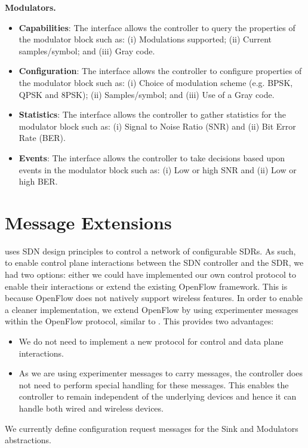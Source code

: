 \textbf{Modulators.}
\begin{itemize}
\item \textbf{Capabilities}: The interface allows the controller to query the properties of the modulator block such as:
    (i) Modulations supported;
    (ii) Current samples/symbol; and
    (iii) Gray code.
\item \textbf{Configuration}: The interface allows the controller to configure properties of the modulator block such as:
    (i) Choice of modulation scheme (e.g. BPSK, QPSK and 8PSK);
    (ii) Samples/symbol; and
    (iii) Use of a Gray code.
\item \textbf{Statistics}: The interface allows the controller to gather statistics for the modulator block such as:
    (i) Signal to Noise Ratio (SNR) and 
    (ii) Bit Error Rate (BER).
\item \textbf{Events}: The interface allows the controller to take decisions based upon events in the modulator block such as:
    (i) Low or high SNR and
    (ii) Low or high BER.
\end{itemize}

\section{\crossflow Message Extensions}
\label{sec:messages}
  		  
\crossflow uses SDN design principles to control a network of configurable SDRs. As such, to enable control plane interactions between the SDN controller and the SDR, we had two options: either we could have implemented our own control protocol to enable their interactions or extend the existing OpenFlow \cite{openflow} framework. This is because OpenFlow does not natively support wireless features. In order to enable a cleaner implementation, we extend OpenFlow by using experimenter messages within the OpenFlow protocol, similar to \aetherflow. This provides two advantages:
\begin{itemize}
\item We do not need to implement a new protocol for control and data plane interactions.
\item As we are using experimenter messages to carry \crossflow messages, the controller does not need to perform special handling for these messages. This enables the controller to remain independent of the underlying devices and hence it can handle both wired and wireless devices. 
\end{itemize} 
We currently define configuration request messages for the Sink and Modulators abstractions.
